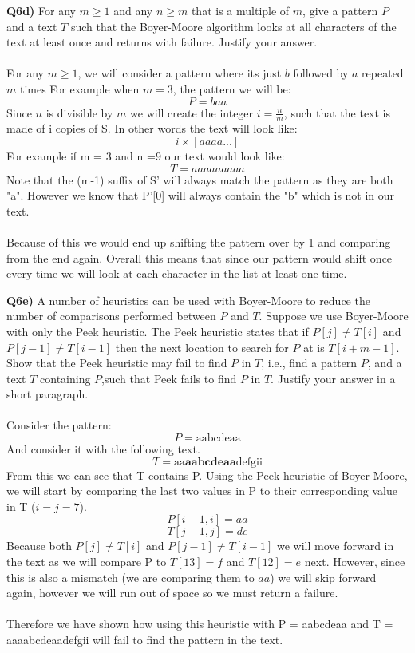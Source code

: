 \documentclass[12pt]{article}
\begin{document}
\newpage
\begin{adjustwidth}{0em}{0pt}
\textbf{Q6d)} For any $m\geq 1$ and any $n \geq m$ that is a multiple of $m$, give a pattern $P$ and a text $T$
such that the Boyer-Moore algorithm looks at all characters of the text at least once and returns with failure. Justify your answer. \\\\
For any $m\geq 1$, we will consider a pattern where its just $b$ followed by $a$ repeated $m$ times For example when $m=3$, the pattern we will be:
\[ P = baa \]
Since $n$ is divisible by $m$ we will create the integer $i = \frac{n}{m}$, such that the text is made of i copies of S. In other words the text will look like:
\[ i \times [aaaa...] \]
For example if m = 3 and n =9 our text would look like:
\[ T = aaaaaaaaa \]
Note that the (m-1) suffix of S' will always match the pattern as they are both "a". However we know that P'[0] will always contain the "b" which is not in our text.\\\\ Because of this we would end up shifting the pattern over by 1 and comparing from the end again. Overall this means that since our pattern would shift once every time we will look at each character in the list at least one time.
\end{adjustwidth} 
\newpage
\begin{adjustwidth}{0em}{0pt}
\textbf{Q6e)} A number of heuristics can be used with Boyer-Moore to reduce the number of comparisons performed between $P$ and $T$.  Suppose we use Boyer-Moore with only the Peek heuristic.  The Peek heuristic states that if $P[j] \neq T[i]$ and $P[j-1] \neq T[i-1]$ then the next location to search for $P$ at is $T[i+m-1]$. Show that the Peek heuristic may fail to find $P$ in $T$, i.e., find a pattern $P$, and a text $T$ containing $P$,such that Peek fails to find $P$ in $T$. Justify your answer in a short paragraph. \\\\
Consider the pattern:
\[ P = \text{aabcdeaa} \]
And consider it with the following text.
\[ T = \text{aa}\textbf{aabcdeaa}\text{defgii}\]
From this we can see that T contains P. Using the Peek heuristic of Boyer-Moore, we will start by comparing the last two values in P to their corresponding value in T ($i=j=7$).
\[ P[i-1,i] = aa \]
\[ T[j-1,j] = de \]
Because both $P[j] \neq T[i]$ and $P[j-1] \neq T[i-1]$ we will move forward in the text as we will compare P to $T[13]=f$ and $T[12]=e$ next. However, since this is also a mismatch (we are comparing them to $aa$) we will skip forward again, however we will run out of space so we must return a failure. \\\\ Therefore we have shown how using this heuristic with P = aabcdeaa and T = aaaabcdeaadefgii will fail to find the pattern in the text.

\end{adjustwidth} 
\end{document}

